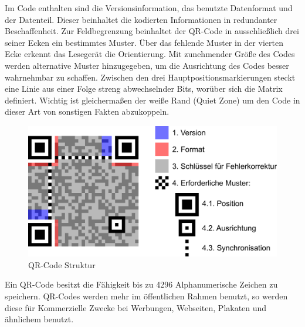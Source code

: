 \documentclass[12pt,					%
							 oneside,			%
							 a4paper,			%
							 halfparskip,		%
							 liststotoc,			%
							 bibtotoc,			%
							 fleqn,				%
							 pointlessnumbers]	%
							 {scrreprt}
\begin{document}
Im Code enthalten sind die Versionsinformation, das benutzte Datenformat und der Datenteil. Dieser beinhaltet die kodierten Informationen in redundanter Beschaffenheit. Zur Feldbegrenzung beinhaltet der QR-Code in ausschließlich drei seiner Ecken ein bestimmtes Muster. Über das fehlende Muster in der vierten Ecke erkennt das Lesegerät die Orientierung. Mit zunehmender Größe des Codes werden alternative Muster hinzugegeben, um die Ausrichtung des Codes besser wahrnehmbar zu schaffen. Zwischen den drei Hauptpositionsmarkierungen steckt eine Linie aus einer Folge streng abwechselnder Bits, worüber sich die Matrix definiert. Wichtig ist gleichermaßen der weiße Rand (Quiet Zone) um den Code in dieser Art von sonstigen Fakten abzukoppeln. 
\newpage
\begin{figure}[ht]
\centering   
	 \includegraphics[scale=0.12]{pictures/QRCodeBild} 
 	\caption{QR-Code Struktur}
\end{figure}

Ein QR-Code besitzt die Fähigkeit bis zu 4296 Alphanumerische Zeichen zu speichern. QR-Codes werden mehr im öffentlichen Rahmen benutzt, so werden diese für Kommerzielle Zwecke bei Werbungen, Webseiten, Plakaten und ähnlichem benutzt.
\end{document}
